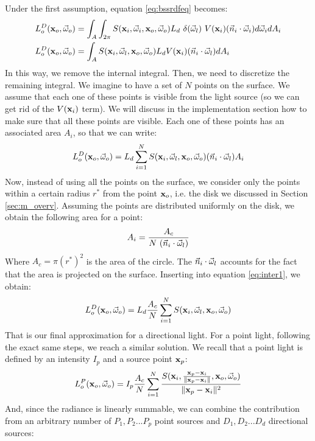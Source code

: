 Under the first assumption, equation \ref{eq:bssrdfeq} becomes:
\begin{equation*}
\begin{split}
L_o^D(\mathbf{x}_o,\vec{\omega}_o) &= \int_A \int_{2\pi} S(\mathbf{x}_i, \vec{\omega}_i, \mathbf{x}_o, \vec{\omega}_o) L_d \ \delta(\vec{\omega}_l)\ V(\mathbf{x}_i) (\vec{n}_i \cdot \vec{\omega}_i) d\vec{\omega}_i d A_i \\
L_o^D(\mathbf{x}_o,\vec{\omega}_o) &= \int_A S(\mathbf{x}_i, \vec{\omega}_l, \mathbf{x}_o, \vec{\omega}_o) L_d  V(\mathbf{x}_i) (\vec{n}_i \cdot \vec{\omega}_l) d A_i 
\end{split}
\end{equation*}
In this way, we remove the internal integral. Then, we need to discretize the remaining integral. We imagine to have a set of $N$ points on the surface. We assume that each one of these points is visible from the light source (so we can get rid of the $V(\mathbf{x}_i)$ term). We will discuss in the implementation section how to make sure that all these points are visible. Each one of these points has an associated area $A_i$, so that we can write:
\begin{equation}
L_o^D(\mathbf{x}_o,\vec{\omega}_o) = L_d \sum_{i = 1}^N S(\mathbf{x}_i, \vec{\omega}_l, \mathbf{x}_o, \vec{\omega}_o) (\vec{n}_i \cdot \vec{\omega}_l) A_i 
\label{eq:inter1}
\end{equation}
Now, instead of using all the points on the surface, we consider only the points within a certain radius $r^*$ from the point $\mathbf{x}_o$, i.e. the disk we discussed in Section \ref{sec:m_overv}. Assuming the points are distributed uniformly on the disk, we obtain the following area for a point:
$$
A_i = \frac{A_c}{N \ (\vec{n}_i \cdot \vec{\omega}_l)}
$$
Where $A_c = \pi (r^*)^2$ is the area of the circle. The $\vec{n}_i \cdot \vec{\omega}_l$ accounts for the fact that the area is projected on the surface. Inserting into equation \ref{eq:inter1}, we obtain:
\begin{equation}
L_o^D(\mathbf{x}_o,\vec{\omega}_o) = L_d \frac{A_c}{N} \sum_{i = 1}^N S(\mathbf{x}_i, \vec{\omega}_l, \mathbf{x}_o, \vec{\omega}_o)
\label{eq:inter2}
\end{equation}
That is our final approximation for a directional light. For a point light, following the exact same steps, we reach a similar solution. We recall that a point light is defined by an intensity $I_p$ and a source point $\mathbf{x}_p$:
\begin{equation}
L_o^P(\mathbf{x}_o,\vec{\omega}_o) = I_p \frac{A_c}{N} \sum_{i = 1}^N \frac{S(\mathbf{x}_i, \frac{\mathbf{x}_p - \mathbf{x}_i}{\|\mathbf{x}_p - \mathbf{x}_i\|}, \mathbf{x}_o, \vec{\omega}_o)}{\|\mathbf{x}_p - \mathbf{x}_i\|^2}
\label{eq:inter3}
\end{equation}
And, since the radiance is linearly summable, we can combine the contribution from an arbitrary number of $P_1, P_2 ... P_p$ point sources and $D_1, D_2 ... D_d$ directional sources:
